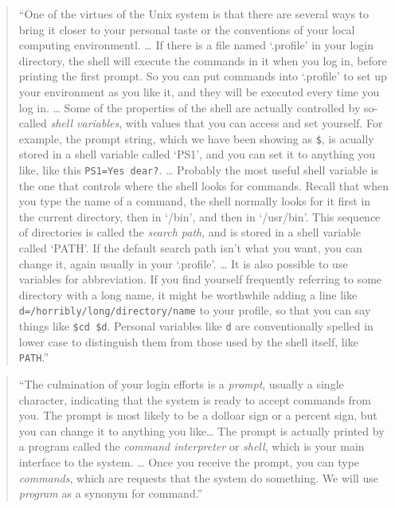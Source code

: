 \documentclass[]{tufte-book}
\begin{document}
\begin{quote}
``One of the virtues of the Unix system is that there are several ways to bring it closer to
your personal taste or the conventions of your local computing environmentl. \ldots{} If there is a file
named `.profile' in your login directory, the shell will execute the commands in it when you log in,
before printing the first prompt. So you can put commands into `.profile' to set up your environment
as you like it, and they will be executed every time you log in. \ldots{}
Some of the properties of the shell are actually controlled by so-called \emph{shell variables}, with
values that you can access and set yourself. For example, the prompt string, which we have been showing
as \texttt{\$}, is acually stored in a shell variable called `PS1', and you can set it to anything you like, like
this \texttt{PS1=\textquotesingle{}Yes\ dear?\textquotesingle{}}. \ldots{} Probably the most useful shell variable is the one that controls where the shell
looks for commands. Recall that when you type the name of a command, the shell normally looks for it
first in the current directory, then in `/bin', and then in `/usr/bin'. This sequence of directories
is called the \emph{search path}, and is stored in a shell variable called `PATH'. If the default search
path isn't what you want, you can change it, again usually in your `.profile'. \ldots{} It is also possible
to use variables for abbreviation. If you find yourself frequently referring to some directory with
a long name, it might be worthwhile adding a line like \texttt{d=/horribly/long/directory/name} to your profile,
so that you can say things like \texttt{\$cd\ \$d}. Personal variables like \texttt{d} are conventionally spelled
in lower case to distinguish them from those used by the shell itself, like \texttt{PATH}.'' \citep{kernighan1984unix}
\end{quote}

\begin{quote}
``The culmination of your login efforts is a \emph{prompt}, usually a single character, indicating that the
system is ready to accept commands from you. The prompt is most likely to be a dolloar sign or a percent
sign, but you can change it to anything you like\ldots{} The prompt is actually printed by a program called
the \emph{command interpreter} or \emph{shell}, which is your main interface to the system. \ldots{} Once you receive
the prompt, you can type \emph{commands}, which are requests that the system do something. We will use \emph{program}
as a synonym for command.'' \citep{kernighan1984unix}
\end{quote}
\end{document}
